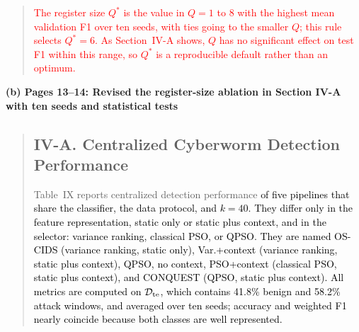 \documentclass[11pt]{article}
\newenvironment{excerpt}{\begin{quote}\sloppy}{\end{quote}}
\newcommand{\mshead}[2]{\subsection*{\textbf{#1. #2}}}
\newcommand{\loc}[1]{\par\medskip\noindent\textbf{#1}\par}
\begin{document}
\begin{excerpt}
\textcolor{red}{The register size $Q^{*}$ is the value in
$Q=1$ to $8$ with the highest mean validation F1 over ten seeds, with
ties going to the smaller $Q$; this rule selects $Q^{*}=6$. As Section~IV-A
shows, $Q$ has no significant effect on test F1 within this range, so $Q^{*}$ is a
reproducible default rather than an optimum.}
\end{excerpt}

\loc{(b) Pages 13--14: Revised the register-size ablation in Section IV-A with ten seeds and statistical tests}
\begin{excerpt}
\mshead{IV-A}{Centralized Cyberworm Detection Performance}


Table~IX reports centralized detection
performance \textcolor{black}{of five pipelines that share the
classifier, the data protocol, and $k=40$. They differ only in the
feature representation, static only or static plus context, and in
the selector: variance ranking, classical PSO, or QPSO. They are named
OS-CIDS (variance ranking, static only), Var.+context (variance
ranking, static plus context), QPSO, no context, PSO+context
(classical PSO, static plus context), and CONQUEST (QPSO, static plus
context). All metrics
are computed on $\mathcal{D}_{\rm te}$, which contains 41.8\% benign
and 58.2\% attack windows, and averaged over ten seeds; accuracy and
weighted F1 nearly coincide because both classes are well
represented.}

\setcounter{table}{8}
\begin{table}[H]
\centering
\caption{\textcolor{black}{Centralized detection over ten seeds, with Wilcoxon p-values against CONQUEST. \textsuperscript{\textdagger}Conference result~{[9]}, not directly comparable.}}


\end{table}
\end{excerpt}
\end{document}

